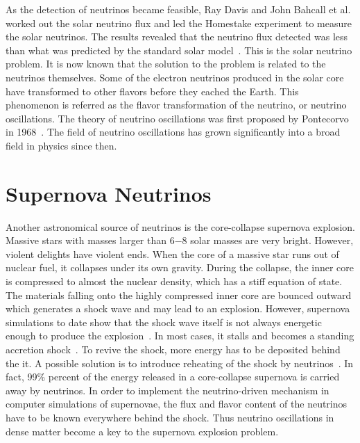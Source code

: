 As the detection of neutrinos became feasible, Ray Davis and John Bahcall et al. worked out the solar neutrino flux and led the Homestake experiment to measure the solar neutrinos. The results revealed that the neutrino flux detected was less than what was predicted by the standard solar model~\cite{Bahcall1973}. This is the solar neutrino problem. It is now known that the solution to the problem is related to the neutrinos themselves. Some of the electron neutrinos produced in the solar core have transformed to other flavors before they eached the Earth. This phenomenon is referred as the flavor transformation of the neutrino, or neutrino oscillations. The theory of neutrino oscillations was first proposed by Pontecorvo in 1968~\cite{Pontecorvo1968}. The field of neutrino oscillations has grown significantly into a broad field in physics since then.



\section{Supernova Neutrinos}


Another astronomical source of neutrinos is the core-collapse supernova explosion. Massive stars with masses larger than 6−8 solar masses are very bright. However, violent delights have violent ends. When the core of a massive star runs out of nuclear fuel, it collapses under its own gravity. During the collapse, the inner core is compressed to almost the nuclear density, which has a stiff equation of state. The materials falling onto the highly compressed inner core are bounced outward which generates a shock wave and may lead to an explosion. However, supernova simulations to date show that the shock wave itself is not always energetic enough to produce the explosion~\cite{Janka2016b}. In most cases, it stalls and becomes a standing accretion shock~\cite{Bethe1985r}. To revive the shock, more energy has to be deposited behind the it. A possible solution is to introduce reheating of the shock by neutrinos~\cite{Janka2016b}. In fact, 99\% percent of the energy released in a core-collapse supernova is carried away by neutrinos.
In order to implement the neutrino-driven mechanism in computer simulations of supernovae, the flux and flavor content of the neutrinos have to be known everywhere behind the shock. Thus neutrino oscillations in dense matter become a key to the supernova explosion problem.

